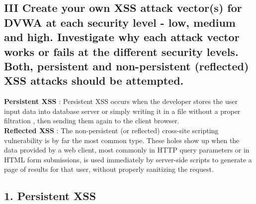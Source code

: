 \documentclass{article}
\begin{document}
\subsection*{III Create your own XSS attack vector(s) for DVWA at each security level - low,
medium and high. Investigate why each attack vector works or fails at the
different security levels. Both, persistent and non-persistent (reflected) XSS
attacks should be attempted.}
\textbf{Persistent XSS} : Persistent XSS occurs when the developer stores the user input data into database server
or simply writing it in a file without a proper filtration , then sending them again to the client
browser.\\
\textbf{Reflected XSS} : The non-persistent (or reflected) cross-site scripting vulnerability is by far the
most common type. These holes show up when the data provided by a web client, most commonly
in HTTP query parameters or in HTML form submissions, is used immediately by server-side scripts
to generate a page of results for that user, without properly sanitizing the request.\\
\subsection*{1. Persistent XSS}
\end{document}
